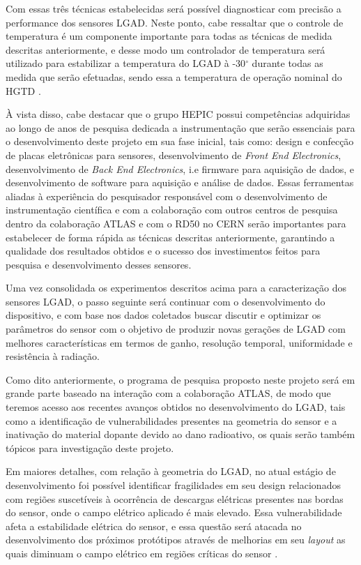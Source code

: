 Com essas três técnicas estabelecidas será possível diagnosticar com precisão a performance dos sensores LGAD. Neste ponto, cabe ressaltar que o controle de temperatura é um componente importante para todas as técnicas de medida descritas anteriormente, e desse modo um controlador de temperatura será utilizado para estabilizar a temperatura do LGAD à -30$^{\circ}$ durante todas as medida que serão efetuadas, sendo essa a temperatura de operação nominal do HGTD \cite{tdr}.

À vista disso, cabe destacar que o grupo HEPIC possui competências adquiridas ao longo de anos de pesquisa dedicada a instrumentação que serão essenciais para o desenvolvimento deste projeto em sua fase inicial, tais como: design e confecção de placas eletrônicas para sensores, desenvolvimento de {\it Front End Electronics}, desenvolvimento de {\it Back End Electronics}, i.e firmware para aquisição de dados, e desenvolvimento de software para aquisição e análise de dados. Essas ferramentas aliadas à experiência do pesquisador responsável com o desenvolvimento de instrumentação científica \cite{tpcNIM,discharge_paper,THGEM} e com a colaboração com outros centros de pesquisa dentro da colaboração ATLAS e com o RD50 no CERN serão importantes para estabelecer de forma rápida as técnicas descritas anteriormente, garantindo a qualidade dos resultados obtidos e o sucesso dos investimentos feitos para pesquisa e desenvolvimento desses sensores. 

Uma vez consolidada os experimentos descritos acima para a caracterização dos sensores LGAD, o passo seguinte será continuar com o desenvolvimento do dispositivo, e com base nos dados coletados buscar discutir e optimizar os parâmetros do sensor com o objetivo de produzir novas gerações de LGAD com melhores características em termos de ganho, resolução temporal, uniformidade e resistência à radiação. 

Como dito anteriormente, o programa de pesquisa proposto neste projeto será em grande parte baseado na interação com a colaboração ATLAS, de modo que teremos acesso aos recentes avanços obtidos no desenvolvimento do LGAD, tais como a identificação de vulnerabilidades presentes na geometria do sensor e a inativação do material dopante devido ao dano radioativo, os quais serão também tópicos para investigação deste projeto.

Em maiores detalhes, com relação à geometria do LGAD, no atual estágio de desenvolvimento foi possível identificar fragilidades em seu design relacionados com regiões suscetíveis à ocorrência de descargas elétricas presentes nas bordas do sensor, onde o campo elétrico aplicado é mais elevado. Essa vulnerabilidade afeta a estabilidade elétrica do sensor, e essa questão será atacada no desenvolvimento dos próximos protótipos através de melhorias em seu {\it layout} as quais diminuam o campo elétrico em regiões críticas do sensor \cite{tdr}.  

